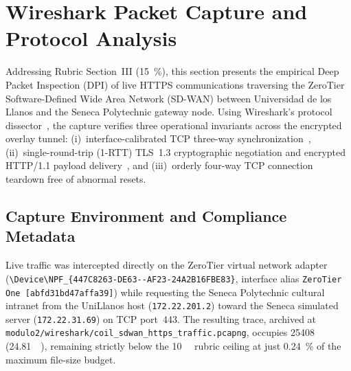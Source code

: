 \section{Wireshark Packet Capture and Protocol Analysis}
\label{sec:wireshark_analysis}

Addressing Rubric Section~III (\qty{15}{\percent}), this section presents the empirical Deep Packet Inspection (DPI) of live HTTPS communications traversing the ZeroTier Software-Defined Wide Area Network (SD-WAN) between Universidad de los Llanos and the Seneca Polytechnic gateway node. Using Wireshark's protocol dissector~\cite{wireshark2023}, the capture verifies three operational invariants across the encrypted overlay tunnel: (i)~interface-calibrated TCP three-way synchronization~\cite{rfc9293,kozierok2005}, (ii)~single-round-trip (1-RTT) TLS~1.3 cryptographic negotiation and encrypted HTTP/1.1 payload delivery~\cite{rfc8446,tanenbaum2021}, and (iii)~orderly four-way TCP connection teardown free of abnormal resets.

\subsection{Capture Environment and Compliance Metadata}
\label{subsec:pcap_metadata}

Live traffic was intercepted directly on the ZeroTier virtual network adapter (\texttt{\textbackslash{}Device\textbackslash{}NPF\_\allowbreak\{447C8263-\allowbreak DE63--\allowbreak AF23-\allowbreak 24A2B16FBE83\}}, interface alias \texttt{ZeroTier One [abfd31bd47affa39]}) while requesting the Seneca Polytechnic cultural intranet from the UniLlanos host (\nolinkurl{172.22.201.2}) toward the Seneca simulated server (\nolinkurl{172.22.31.69}) on TCP port~443. The resulting trace, archived at \nolinkurl{modulo2/wireshark/coil_sdwan_https_traffic.pcapng}, occupies \qty{25408}{\byte} (\qty{24.81}{\kilo\byte}), remaining strictly below the \qty{10}{\mega\byte} rubric ceiling at just \qty{0.24}{\percent} of the maximum file-size budget.

